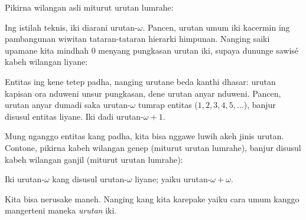 \documentclass[../../../include/open-logic-section]{subfiles}
\begin{document}

Pikirna wilangan asli miturut urutan lumrahe:
\begin{center}
\end{center}
Ing istilah teknis, iki diarani urutan-$\omega$.
Pancen, urutan umum iki kacermin ing pambangunan wiwitan
tataran-tataran hierarki himpunan. Nanging saiki upamane
kita mindhah $0$ menyang pungkasan urutan iki, supaya
dununge sawisé kabeh wilangan liyane:
\begin{center}
\end{center}
Entitas ing kene tetep padha, nanging urutane beda
kanthi dhasar: urutan kapisan ora nduweni unsur pungkasan,
dene urutan anyar nduweni. Pancen, urutan anyar dumadi
saka urutan-$\omega$ tumrap entitas
($1, 2, 3, 4, 5, \ldots$), banjur disusul entitas liyane.
Iki dadi urutan-$\omega+1$.

Mung nganggo entitas kang padha, kita bisa nggawe luwih
akeh jinis urutan. Contone, pikirna kabeh wilangan genep
(miturut urutan lumrahe), banjur disusul kabeh wilangan
ganjil (miturut urutan lumrahe):
\begin{center}
\end{center}
Iki urutan-$\omega$ kang disusul urutan-$\omega$ liyane;
yaiku urutan-$\omega+\omega$.

Kita bisa nerusake maneh. Nanging kang kita karepake
yaiku cara umum kanggo mangerteni maneka \emph{urutan} iki.
\end{document}
